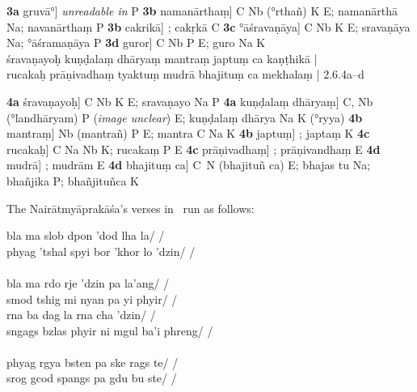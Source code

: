 \documentclass[naipra.tex]{subfiles}
\begin{document}
\begin{sanskrit}
{\begin{english}
\begin{prosequote}
			\noindent \textbf{3a} gruvā°] \emph{unreadable in} P
			\textbf{3b} namanārthaṃ] C Nb (°rthañ) K E; namanārthā Na; navanārthaṃ P
			\textbf{3b} cakrikā] ; cakṛkā C
			\textbf{3c} °āśravaṇāya] C Nb K E; sravaṇāya Na; °āśramaṇāya P
			\textbf{3d} guror] C Nb P E; guro Na K\\

			\noindent śravaṇayoḥ kuṇḍalaṃ dhāryaṃ mantraṃ japtuṃ ca kaṇṭhikā |\\
			rucakaḥ prāṇivadhaṃ tyaktuṃ mudrā bhajituṃ ca mekhalaṃ | 2.6.4a–d
			\medskip

			\noindent \textbf{4a} śravaṇayoḥ] C Nb K E; sravaṇayo Na P
			\textbf{4a} kuṇḍalaṃ dhāryaṃ] C, Nb (°landhāryam) P (\emph{image unclear}) E; kuṇḍalaṃ dhārya Na K (°ryya)
			\textbf{4b} mantraṃ] Nb (mantrañ) P E; mantra C Na K
			\textbf{4b} japtuṃ] ; japtaṃ K
			\textbf{4c} rucakaḥ] C Na Nb K; rucakaṃ P E
			\textbf{4c} prāṇivadhaṃ] ; prāṇivandhaṃ E
			\textbf{4d} mudrā] ; mudrām E
			\textbf{4d} bhajituṃ ca] C\PCreading\ N (bhajituñ ca) E; bhajas tu Na; bhañjika P; bhañjituñca K
		\end{prosequote}

		The Nairātmyāprakāśa's verses in \TIB\ run as follows:

		\begin{prosequote}%
			bla ma slob dpon 'dod lha la/ /\\
			phyag 'tshal spyi bor 'khor lo 'dzin/ /\\
			\\
			bla ma rdo rje 'dzin pa la'ang/ /\\
			smod tshig mi nyan pa yi phyir/ /\\
			rna ba dag la rna cha 'dzin/ /\\
			sngags bzlas phyir ni mgul ba'i phreng/ /\\
			\\
			phyag rgya bsten pa ske rags te/ /\\
			srog gcod spangs pa gdu bu ste/ /
		\end{prosequote}


\end{english}}
\end{sanskrit}
\end{document}
